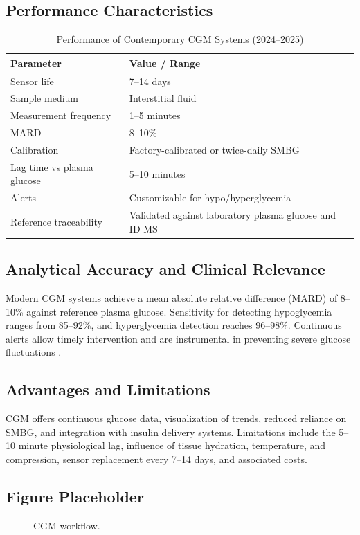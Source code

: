 \documentclass[12pt,a4paper]{article}
\begin{document}
\subsection{Performance Characteristics}
\FloatBarrier
\begin{table}[h!]
\centering
\caption{Performance of Contemporary CGM Systems (2024--2025)}
\begin{tabularx}{\textwidth}{l X}
\hline
\textbf{Parameter} & \textbf{Value / Range} \\
\hline
Sensor life & 7--14 days \\
Sample medium & Interstitial fluid \\
Measurement frequency & 1--5 minutes \\
MARD & 8--10\% \\
Calibration & Factory-calibrated or twice-daily SMBG \\
Lag time vs plasma glucose & 5--10 minutes \\
Alerts & Customizable for hypo/hyperglycemia \\
Reference traceability & Validated against laboratory plasma glucose and ID-MS \\
\hline
\end{tabularx}
\label{tab:cgm_performance}
\end{table}
\FloatBarrier

\subsection{Analytical Accuracy and Clinical Relevance}
Modern CGM systems achieve a mean absolute relative difference (MARD) of 8–10\% against reference plasma glucose. Sensitivity for detecting hypoglycemia ranges from 85–92\%, and hyperglycemia detection reaches 96–98\%. Continuous alerts allow timely intervention and are instrumental in preventing severe glucose fluctuations \cite{CGM_Routine_Care_2024}.

\subsection{Advantages and Limitations}
CGM offers continuous glucose data, visualization of trends, reduced reliance on SMBG, and integration with insulin delivery systems. Limitations include the 5–10 minute physiological lag, influence of tissue hydration, temperature, and compression, sensor replacement every 7–14 days, and associated costs.

\subsection{Figure Placeholder}
\begin{figure}[h!]
\centering
{}
\caption{CGM workflow.}
\label{fig:cgm_workflow}
\end{figure}
\end{document}
